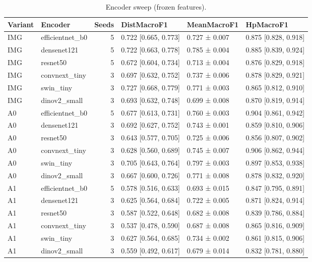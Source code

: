 \begin{table}
\caption{Encoder sweep (frozen features).}
\label{tab:tableS1_encoders}
\begin{tabular}{llrlll}
\toprule
Variant & Encoder & Seeds & DistMacroF1 & MeanMacroF1 & HpMacroF1 \\
\midrule
IMG & efficientnet\_b0 & 5 & 0.722 [0.665, 0.773] & 0.727 ± 0.007 & 0.875 [0.828, 0.918] \\
IMG & densenet121 & 5 & 0.722 [0.663, 0.778] & 0.785 ± 0.004 & 0.885 [0.839, 0.924] \\
IMG & resnet50 & 5 & 0.672 [0.604, 0.734] & 0.713 ± 0.004 & 0.876 [0.829, 0.918] \\
IMG & convnext\_tiny & 3 & 0.697 [0.632, 0.752] & 0.737 ± 0.006 & 0.878 [0.829, 0.921] \\
IMG & swin\_tiny & 3 & 0.727 [0.668, 0.779] & 0.771 ± 0.003 & 0.865 [0.812, 0.910] \\
IMG & dinov2\_small & 3 & 0.693 [0.632, 0.748] & 0.699 ± 0.008 & 0.870 [0.819, 0.914] \\
A0 & efficientnet\_b0 & 5 & 0.677 [0.613, 0.731] & 0.760 ± 0.003 & 0.904 [0.861, 0.942] \\
A0 & densenet121 & 3 & 0.692 [0.627, 0.752] & 0.743 ± 0.001 & 0.859 [0.810, 0.906] \\
A0 & resnet50 & 3 & 0.643 [0.577, 0.705] & 0.725 ± 0.006 & 0.856 [0.807, 0.902] \\
A0 & convnext\_tiny & 3 & 0.628 [0.560, 0.689] & 0.745 ± 0.007 & 0.906 [0.862, 0.944] \\
A0 & swin\_tiny & 3 & 0.705 [0.643, 0.764] & 0.797 ± 0.003 & 0.897 [0.853, 0.938] \\
A0 & dinov2\_small & 3 & 0.667 [0.600, 0.726] & 0.771 ± 0.008 & 0.878 [0.832, 0.920] \\
A1 & efficientnet\_b0 & 5 & 0.578 [0.516, 0.633] & 0.693 ± 0.015 & 0.847 [0.795, 0.891] \\
A1 & densenet121 & 3 & 0.625 [0.564, 0.684] & 0.722 ± 0.005 & 0.871 [0.824, 0.914] \\
A1 & resnet50 & 3 & 0.587 [0.522, 0.648] & 0.682 ± 0.008 & 0.839 [0.786, 0.884] \\
A1 & convnext\_tiny & 3 & 0.537 [0.478, 0.590] & 0.687 ± 0.008 & 0.865 [0.816, 0.909] \\
A1 & swin\_tiny & 3 & 0.627 [0.564, 0.685] & 0.734 ± 0.002 & 0.861 [0.815, 0.906] \\
A1 & dinov2\_small & 3 & 0.559 [0.492, 0.617] & 0.679 ± 0.014 & 0.832 [0.781, 0.880] \\

\end{tabular}
\end{table}
